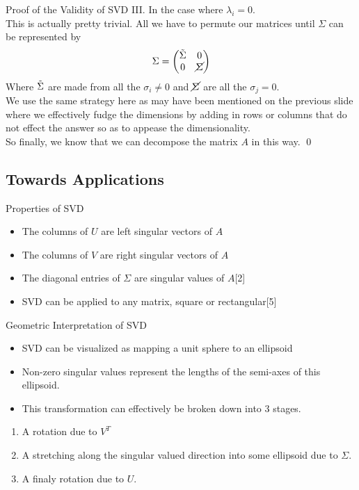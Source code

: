 \documentclass{beamer}
\begin{document}
\begin{frame}{Proof of the Validity of SVD III.}
    In the case where $\lambda_i = 0$.\\ 
    This is actually pretty trivial. All we have to permute our matrices until $\Sigma$ can be represented by
    \begin{equation}
        \Sigma = \begin{pmatrix}
            \Tilde{\Sigma} & 0\\
            0 & \cancel{\Sigma}
        \end{pmatrix}
    \end{equation}
    Where $\Tilde{\Sigma}$ are made from all the $\sigma_i \ne 0$ and $\cancel{\Sigma}$ are all the $\sigma_j = 0$.\\
    We use the same strategy here as may have been mentioned on the previous slide where we effectively fudge the dimensions by adding in rows or columns that do not effect the answer so as to appease the dimensionality. \\
    So finally, we know that we can decompose the matrix $A$ in this way. \hfill \qed
    \end{frame}
\subsection{Towards Applications}
\begin{frame}{Properties of SVD}
    \begin{itemize}
        \item The columns of $U$ are left singular vectors of $A$
        \item The columns of $V$ are right singular vectors of $A$
        \item The diagonal entries of $\Sigma$ are singular values of $A$[2]
        \item SVD can be applied to any matrix, square or rectangular[5]
    \end{itemize}
\end{frame}

\begin{frame}{Geometric Interpretation of SVD}
    \begin{itemize}
        \item SVD can be visualized as mapping a unit sphere to an ellipsoid
        \item Non-zero singular values represent the lengths of the semi-axes of this ellipsoid.
        \item This transformation can effectively be broken down into 3 stages.
    \end{itemize}
    \begin{enumerate}
        \item A rotation due to $V^T$
        \item A stretching along the singular valued direction into some ellipsoid due to $\Sigma$.
        \item A finaly rotation due to $U$.
    \end{enumerate}
\end{frame}
\end{document}
